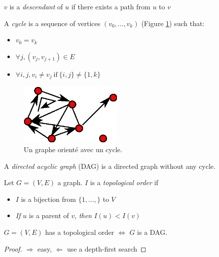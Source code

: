 \documentclass[12pt]{report}
\begin{document}
\begin{definition}[descendant]
  $v$ is a \emph{descendant} of $u$ if there exists a path from $u$ to $v$
\end{definition}

\begin{definition}[cycle]
 A \emph{cycle} is a sequence of vertices $(v_{0},\ldots,v_{k})$ (Figure \ref{graph09}) such that: 
 \begin{itemize}
 \item $v_{0}=v_{k}$
 \item $\forall j,(v_{j},v_{j+1})\in E$
 \item $\forall i,j, v_{i}\neq v_{j}\ \mathrm{if}\ \lbrace i,j\rbrace\neq\lbrace 1,k\rbrace$
 \end{itemize} 
\end{definition}

\begin{figure}[ht]
  \centering
  \includegraphics[width=5cm]{./figures/graph09.eps}
  \caption{Un graphe orienté avec un cycle.}
  \label{graph09}
\end{figure}

\begin{definition}[DAG]
  A \emph{directed acyclic graph} (DAG) is a directed graph without any cycle.
\end{definition}

\begin{definition}
  Let $G=(V,E)$ a graph. $I$ is a \emph{topological order} if 
  \begin{itemize}
  \item $I$ is a bijection from $\lbrace1,\ldots,\rbrace$ to $V$
  \item \emph{If} $u$ is a parent of $v$, \emph{then} $I(u)<I(v)$
  \end{itemize}
\end{definition}

\begin{proposition}
  $G=(V,E)$ has a topological order $\Leftrightarrow$ $G$ is a DAG.
  \end{proposition}
\begin{proof}
$\Rightarrow$ easy,
$\Leftarrow$ use a depth-first search
\end{proof} 
\end{document}
